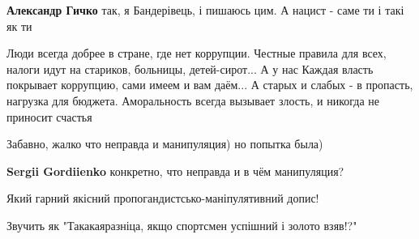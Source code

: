 \begin{itemize}
\begin{itemize}
\textbf{Александр Гичко} так, я Бандерівець, і пишаюсь цим. А нацист - саме ти і такі як ти

\end{itemize} %


Люди всегда добрее в стране, где нет коррупции. Честные правила для всех,
налоги идут на стариков, больницы, детей-сирот... А у нас Каждая власть
покрывает коррупцию, сами имеем и вам даём... А старых и слабых - в пропасть,
нагрузка для бюджета. Аморальность всегда вызывает злость, и никогда не
приносит счастья

Забавно, жалко что неправда и манипуляция) но попытка была)

\begin{itemize} %
\textbf{Sergii Gordiienko} конкретно, что неправда и в чём манипуляция?
\end{itemize} %


Який гарний якісний пропогандистсько-маніпулятивний допис!

Звучить як "Такакаяразніца, якщо спортсмен успішний і золото взяв!?"


\end{itemize} %
